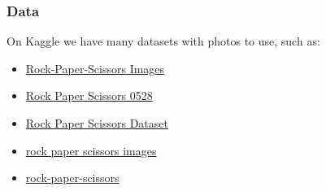 \documentclass{beamer}
\begin{document}
\begin{frame}
    \frametitle{Data}
    On Kaggle we have many datasets with photos to use, such as:
    \begin{itemize}
    \item \href{https://www.kaggle.com/datasets/drgfreeman/rockpaperscissors}{Rock-Paper-Scissors Images}

    \item \href{https://www.kaggle.com/datasets/manasdalakoti/rock-paper-scissors-0528}{Rock Paper Scissors 0528}

    \item \href{https://www.kaggle.com/datasets/sanikamal/rock-paper-scissors-dataset}{Rock Paper Scissors Dataset}

    \item \href{https://www.kaggle.com/datasets/anirudhabhagwat/rock-paper-scissors-images}{rock paper scissors images}

    \item \href{https://www.kaggle.com/datasets/yash811/rockpaperscissors}{rock-paper-scissors}


\end{itemize}
\end{frame}
\end{document}
